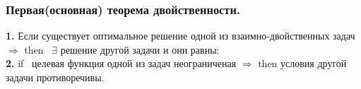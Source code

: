 \subsubsection{Первая(основная) теорема двойственности.}
\textbf{1.} Если существует оптимальное решение одной из взаимно-двойственных задач $\Rightarrow$ then \ $\exists$ решение другой задачи и они равны:\\
\textbf{2.} if \ целевая функция одной из задач неограниченая $\Rightarrow$ then условия другой задачи противоречивы.
